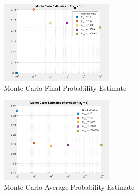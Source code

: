 \documentclass[]{article}
\begin{document}
\begin{figure}[h]
    \centering
    \includegraphics[width = 0.5\textwidth]{figs/pblm4_fig1.png}
    \caption{Monte Carlo Final Probability Estimate}
    \label{fig:pblm4_fig1}
\end{figure}

\begin{figure}[h]
    \centering
    \includegraphics[width = 0.5\textwidth]{figs/pblm4_fig2.png}
    \caption{Monte Carlo Average Probability Estimate}
    \label{fig:pblm4_fig2}
\end{figure}

\newpage


% 
% 
\end{document}
